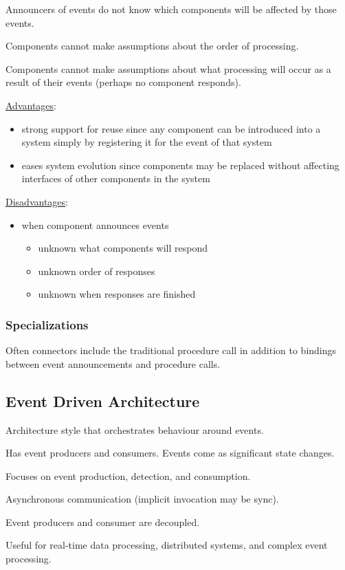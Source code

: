 \documentclass[11pt]{article}
\begin{document}
Announcers of events do not know which components will be affected
by those events.

Components cannot make assumptions about the order of processing.

Components cannot make assumptions about what processing will occur
as a result of their events (perhaps no component responds).

\uline{Advantages}:
\begin{itemize}
\item strong support for reuse since any component can be introduced
into a system simply by registering it for the event of
that system
\item eases system evolution since components may be replaced without
affecting interfaces of other components in the system
\end{itemize}

\uline{Disadvantages}:
\begin{itemize}
\item when component announces events
\begin{itemize}
\item unknown what components will respond
\item unknown order of responses
\item unknown when responses are finished
\end{itemize}
\end{itemize}
\subsubsection{Specializations}
\label{sec:org3edc268}
Often connectors include the traditional procedure call in addition to
bindings between event announcements and procedure calls.
\subsection{Event Driven Architecture}
\label{sec:org50f1076}
Architecture style that orchestrates behaviour around events.

Has event producers and consumers.
Events come as significant state changes.

Focuses on event production, detection, and consumption.

Asynchronous communication (implicit invocation may be sync).

Event producers and consumer are decoupled.

Useful for real-time data processing, distributed systems, and
complex event processing.
\end{document}
